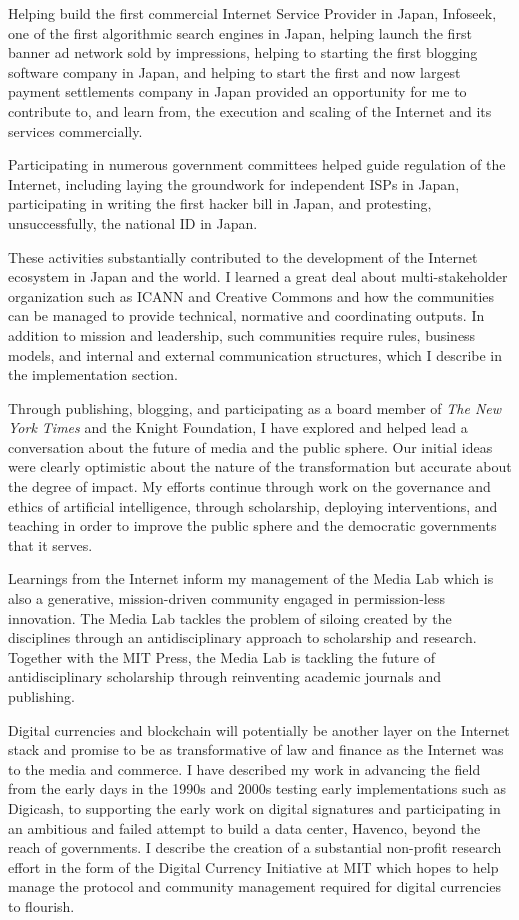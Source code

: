 Helping build the first commercial Internet Service Provider in Japan, Infoseek, one of the first algorithmic search engines in Japan, helping launch the first banner ad network sold by impressions, helping to starting the first blogging software company in Japan, and helping to start the first and now largest payment settlements company in Japan provided an opportunity for me to contribute to, and learn from, the execution and scaling of the Internet and its services commercially.

Participating in numerous government committees helped guide regulation of the Internet, including laying the groundwork for independent ISPs in Japan, participating in writing the first hacker bill in Japan, and protesting, unsuccessfully, the national ID in Japan.

These activities substantially contributed to the development of the Internet ecosystem in Japan and the world. I learned a great deal about multi-stakeholder organization such as \ac{ICANN} and Creative Commons and how the communities can be managed to provide technical, normative and coordinating outputs. In addition to mission and leadership, such communities require rules, business models, and internal and external communication structures, which I describe in the implementation section.

Through publishing, blogging, and participating as a board member of \textit{The New York Times} and the Knight Foundation, I have explored and helped lead a conversation about the future of media and the public sphere. Our initial ideas were clearly optimistic about the nature of the transformation but accurate about the degree of impact. My efforts continue through work on the governance and ethics of artificial intelligence, through scholarship, deploying interventions, and teaching in order to improve the public sphere and the democratic governments that it serves.

Learnings from the Internet inform my management of the Media Lab which is also a generative, mission-driven community engaged in permission-less innovation. The Media Lab tackles the problem of siloing created by the disciplines through an antidisciplinary approach to scholarship and research. Together with the MIT Press, the Media Lab is tackling the future of antidisciplinary scholarship through reinventing academic journals and publishing.

Digital currencies and blockchain will potentially be another layer on the Internet stack and promise to be as transformative of law and finance as the Internet was to the media and commerce. I have described my work in advancing the field from the early days in the 1990s and 2000s testing early implementations such as Digicash, to supporting the early work on digital signatures and participating in an ambitious and failed attempt to build a data center, Havenco, beyond the reach of governments. I describe the creation of a substantial non-profit research effort in the form of the Digital Currency Initiative at MIT which hopes to help manage the protocol and community management required for digital currencies to flourish.

